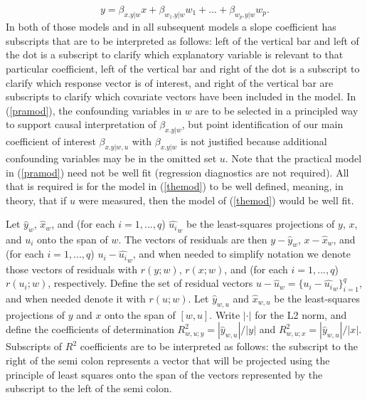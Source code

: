 \documentclass[11pt]{amsart}
\begin{document}
\begin{equation}
\label{pramod}
y=\beta_{x.y|w}x+\beta_{w_1.y|w}w_1+...+\beta_{w_p.y|w}w_p.
\end{equation} 
In both of those models and in all subsequent models a slope coefficient has subscripts that are to be interpreted as follows: left of the vertical bar and left of the dot is a subscript to clarify which explanatory variable is relevant to that particular coefficient, left of the vertical bar and right of the dot is a subscript to clarify which response vector is of interest, and right of the vertical bar are subscripts to clarify which covariate vectors have been included in the model. In (\ref{pramod}), the confounding variables in $w$ are to be selected in a principled way \citep{VandPrinc} to support causal interpretation of $\beta_{x.y|w}$, but point identification of our main coefficient of interest $\beta_{x.y|w,u}$ with $\beta_{x.y|w}$ is not justified because additional confounding variables may be in the omitted set $u$. Note that the practical model in (\ref{pramod}) need not be well fit (regression diagnostics are not required). All that is required is for the model in (\ref{themod}) to be well defined, meaning, in theory, that if $u$ were measured, then the model of (\ref{themod}) would be well fit.%

Let $\hat{y}_w$, $\hat{x}_w$, and (for each $i=1,...,q$) $\hat{u_i}_w$ be the least-squares projections of $y$, $x$, and $u_i$ onto the span of $w$. The vectors of residuals are then $y-\hat{y}_w$, $x-\hat{x}_w$, and (for each $i=1,...,q$) $u_i-\hat{u_i}_w$, and when needed to simplify notation we denote those vectors of residuals with $r(y;w)$, $r(x;w)$, and (for each $i=1,...,q$) $r(u_i;w)$, respectively. Define the set of residual vectors $u-\hat{u}_w=\{u_i-\hat{u_i}_w\}_{i=1}^q$, and when needed denote it with $r(u;w)$. Let $\hat{y}_{w,u}$ and $\hat{x}_{w,u}$ be the least-squares projections of $y$ and $x$ onto the span of $[w,u]$. Write $|\cdot|$ for the L2 norm, and define the coefficients of determination $R^2_{w,u;y}=|\hat{y}_{w,u}|/|y|$ and $R^2_{w,u;x}=|\hat{y}_{w,u}|/|x|$. Subscripts of $R^2$ coefficients are to be interpreted as follows: the subscript to the right of the semi colon represents a vector that will be projected using the principle of least squares onto the span of the vectors represented by the subscript to the left of the semi colon. 
\end{document}
